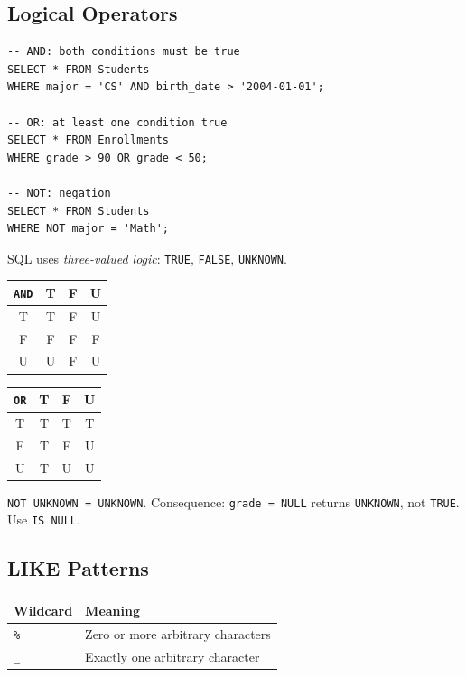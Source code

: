 \subsection{Logical Operators}

\begin{codeblock}[title=\textbf{Combining Conditions}]
\begin{verbatim}
-- AND: both conditions must be true
SELECT * FROM Students
WHERE major = 'CS' AND birth_date > '2004-01-01';

-- OR: at least one condition true
SELECT * FROM Enrollments
WHERE grade > 90 OR grade < 50;

-- NOT: negation
SELECT * FROM Students
WHERE NOT major = 'Math';
\end{verbatim}
\end{codeblock}

\begin{warning}[title=\textbf{Three-Valued Logic and NULL}]
SQL uses \emph{three-valued logic}: \texttt{TRUE}, \texttt{FALSE}, \texttt{UNKNOWN}.
\begin{center}
\begin{tabular}{c|ccc}
\texttt{AND} & T & F & U \\
\hline
T & T & F & U \\
F & F & F & F \\
U & U & F & U \\
\end{tabular}
\qquad
\begin{tabular}{c|ccc}
\texttt{OR} & T & F & U \\
\hline
T & T & T & T \\
F & T & F & U \\
U & T & U & U \\
\end{tabular}
\end{center}
\texttt{NOT UNKNOWN = UNKNOWN}. Consequence: \texttt{grade = NULL}
returns \texttt{UNKNOWN}, not \texttt{TRUE}. Use \texttt{IS NULL}.
\end{warning}

\subsection{LIKE Patterns}

\begin{keyformulas}[title=\textbf{LIKE Wildcards}]
\begin{center}
\begin{tabular}{ll}
\toprule
\textbf{Wildcard} & \textbf{Meaning} \\
\midrule
\texttt{\%} & Zero or more arbitrary characters \\
\texttt{\_} & Exactly one arbitrary character \\
\bottomrule
\end{tabular}
\end{center}
\end{keyformulas}

